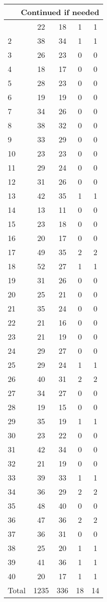 \begin{center}
\begin{longtable}{l|c|c|c|c}
\hline \multicolumn{5}{|r|}{{Continued if needed}} \\ \hline
\endfoot 
1 & 22 & 18 & 1 & 1\\ \hline
2 & 38 & 34 & 1 & 1\\ \hline
3 & 26 & 23 & 0 & 0\\ \hline
4 & 18 & 17 & 0 & 0\\ \hline
5 & 28 & 23 & 0 & 0\\ \hline
6 & 19 & 19 & 0 & 0\\ \hline
7 & 34 & 26 & 0 & 0\\ \hline
8 & 38 & 32 & 0 & 0\\ \hline
9 & 33 & 29 & 0 & 0\\ \hline
10 & 23 & 23 & 0 & 0\\ \hline
11 & 29 & 24 & 0 & 0\\ \hline
12 & 31 & 26 & 0 & 0\\ \hline
13 & 42 & 35 & 1 & 1\\ \hline
14 & 13 & 11 & 0 & 0\\ \hline
15 & 23 & 18 & 0 & 0\\ \hline
16 & 20 & 17 & 0 & 0\\ \hline
17 & 49 & 35 & 2 & 2\\ \hline
18 & 52 & 27 & 1 & 1\\ \hline
19 & 31 & 26 & 0 & 0\\ \hline
20 & 25 & 21 & 0 & 0\\ \hline
21 & 35 & 24 & 0 & 0\\ \hline
22 & 21 & 16 & 0 & 0\\ \hline
23 & 21 & 19 & 0 & 0\\ \hline
24 & 29 & 27 & 0 & 0\\ \hline
25 & 29 & 24 & 1 & 1\\ \hline
26 & 40 & 31 & 2 & 2\\ \hline
27 & 34 & 27 & 0 & 0\\ \hline
28 & 19 & 15 & 0 & 0\\ \hline
29 & 35 & 19 & 1 & 1\\ \hline
30 & 23 & 22 & 0 & 0\\ \hline
31 & 42 & 34 & 0 & 0\\ \hline
32 & 21 & 19 & 0 & 0\\ \hline
33 & 39 & 33 & 1 & 1\\ \hline
34 & 36 & 29 & 2 & 2\\ \hline
35 & 48 & 40 & 0 & 0\\ \hline
36 & 47 & 36 & 2 & 2\\ \hline
37 & 36 & 31 & 0 & 0\\ \hline
38 & 25 & 20 & 1 & 1\\ \hline
39 & 41 & 36 & 1 & 1\\ \hline
40 & 20 & 17 & 1 & 1\\ \hline
Total & 1235 & 336 & 18 & 14
\end{longtable}
\end{center}



